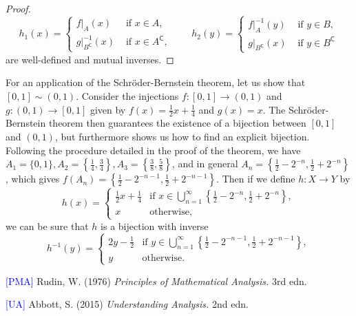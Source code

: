 \documentclass[12pt]{article}
\theoremstyle{definition}
\begin{document}
\begin{proof}
    \[
        h_1(x) = \begin{cases}
            f|_A(x) & \text{ if } x \in A, \\
            g|_{B^{\mathsf{C}}}^{-1}(x) & \text{ if } x \in A^{\mathsf{C}},
        \end{cases}
        \qquad
        h_2(y) = \begin{cases}
            f|_A^{-1}(y) & \text{ if } y \in B, \\
            g|_{B^{\mathsf{C}}}(x) & \text{ if } y \in B^{\mathsf{C}}
        \end{cases}
    \]
    are well-defined and mutual inverses.
\end{proof}

For an application of the Schröder-Bernstein theorem, let us show that \( [0, 1] \sim (0, 1) \). Consider the injections \( f : [0, 1] \to (0, 1) \) and \( g : (0, 1) \to [0, 1] \) given by \( f(x) = \tfrac{1}{2}x + \tfrac{1}{4} \) and \( g(x) = x \). The Schröder-Bernstein theorem then guarantees the existence of a bijection between \( [0, 1] \) and \( (0, 1) \), but furthermore shows us how to find an explicit bijection. Following the procedure detailed in the proof of the theorem, we have \( A_1 = \{ 0, 1 \}, A_2 = \left\{ \tfrac{1}{4}, \tfrac{3}{4} \right\}, A_3 = \left\{ \tfrac{3}{8}, \tfrac{5}{8} \right\} \), and in general \( A_n = \left\{ \tfrac{1}{2} - 2^{-n}, \tfrac{1}{2} + 2^{-n} \right\} \), which gives \( f(A_n) = \left\{ \tfrac{1}{2} - 2^{-n-1}, \tfrac{1}{2} + 2^{-n-1} \right\} \). Then if we define \( h : X \to Y \) by
\[
    h(x) = \begin{cases}
        \tfrac{1}{2}x + \tfrac{1}{4} & \text{if } x \in \bigcup_{n=1}^{\infty} \left\{ \tfrac{1}{2} - 2^{-n}, \tfrac{1}{2} + 2^{-n} \right\}, \\
        x & \text{otherwise},
    \end{cases}
\]
we can be sure that \( h \) is a bijection with inverse
\[
    h^{-1}(y) = \begin{cases}
        2y - \tfrac{1}{2} & \text{if } y \in \bigcup_{n=1}^{\infty} \left\{ \tfrac{1}{2} - 2^{-n-1}, \tfrac{1}{2} + 2^{-n-1} \right\}, \\
        y & \text{otherwise}.
    \end{cases}
\]

\noindent \hrulefill

\noindent \hypertarget{pma}{\textcolor{blue}{[PMA]} Rudin, W. (1976) \textit{Principles of Mathematical Analysis.} 3rd edn.}

\noindent \hypertarget{ua}{\textcolor{blue}{[UA]} Abbott, S. (2015) \textit{Understanding Analysis.} 2nd edn.}
\end{document}
